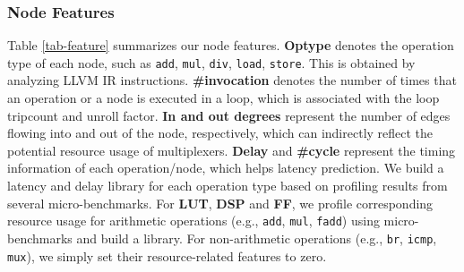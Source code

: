 \documentclass[conference]{IEEEtran}
\begin{document}
\subsubsection{Node Features} Table \ref{tab-feature} summarizes our node features.
\textbf{Optype} denotes the operation type of each node, such as \verb|add|, \verb|mul|, \verb|div|, \verb|load|, \verb|store|. This is obtained by analyzing LLVM IR instructions. \textbf{\#invocation} denotes the number of times that an operation or a node is executed in a loop, which is associated with the loop tripcount and unroll factor. %
\textbf{In and out degrees} represent the number of edges flowing into and out of the node, respectively, which can indirectly reflect the potential resource usage of multiplexers.
\textbf{Delay} and \textbf{\#cycle} represent the timing information of each operation/node, which helps latency prediction. We build a latency and delay library for each operation type based on profiling results from several micro-benchmarks.
For \textbf{LUT}, \textbf{DSP} and \textbf{FF}, we profile corresponding resource usage for arithmetic operations (e.g., \verb|add|, \verb|mul|, \verb|fadd|) using micro-benchmarks and build a library. For non-arithmetic operations (e.g., \verb|br|, \verb|icmp|, \verb|mux|), we simply set their resource-related features to zero. 
\end{document}
